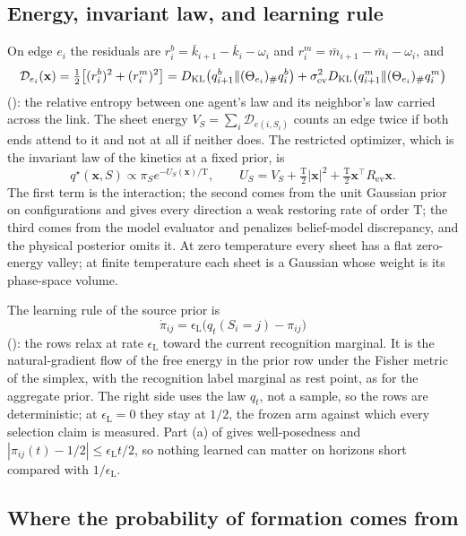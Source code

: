 \subsection{Energy, invariant law, and learning rule}

On edge $e_i$ the residuals are $r^b_i=\bar k_{i+1}-\bar k_i-\omega_i$ and
$r^m_i=\bar m_{i+1}-\bar m_i-\omega_i$, and
\[
\mathcal D_{e_i}(\mathbf x)=\tfrac12\bigl[(r^b_i)^2+(r^m_i)^2\bigr]
=D_{\mathrm{KL}}\bigl(q^b_{i+1}\Vert(\Theta_{e_i})_\#q^b_i\bigr)
+\sigma^2_{\mathrm{ev}}D_{\mathrm{KL}}\bigl(q^m_{i+1}\Vert(\Theta_{e_i})_\#q^m_i\bigr)
\]
(): the relative entropy between one agent's law and its neighbor's law
carried across the link. The sheet energy $V_S=\sum_i\mathcal D_{e(i,S_i)}$ counts an edge twice if both
ends attend to it and not at all if neither does. The restricted optimizer, which is the invariant law of
the kinetics at a fixed prior, is
\[
q^\star(\mathbf x,S)\propto\pi_Se^{-U_S(\mathbf x)/\mathrm T},
\qquad
U_S=V_S+\tfrac{\mathrm T}2|\mathbf x|^2+\tfrac{\mathrm T}2\mathbf x^\top R_{\mathrm{ev}}\mathbf x.
\]
The first term is the interaction; the second comes from the unit Gaussian prior on configurations and
gives every direction a weak restoring rate of order $\mathrm T$; the third comes from the model evaluator
and penalizes belief-model discrepancy, and the physical posterior omits it. At zero temperature every
sheet has a flat zero-energy valley; at finite temperature each sheet is a Gaussian whose weight is its
phase-space volume.

The learning rule of the source prior is
\[
\dot\pi_{ij}=\epsilon_{\mathrm L}\bigl(q_t(S_i=j)-\pi_{ij}\bigr)
\]
(): the rows relax at rate $\epsilon_{\mathrm L}$ toward the current
recognition marginal. It is the natural-gradient flow of the free energy in the prior row under the Fisher
metric of the simplex, with the recognition label marginal as rest point, as for the aggregate prior. The
right side uses the law $q_t$, not a sample, so the rows are deterministic; at $\epsilon_{\mathrm L}=0$
they stay at $1/2$, the frozen arm against which every selection claim is measured. Part (a) of
 gives well-posedness and $|\pi_{ij}(t)-1/2|\le\epsilon_{\mathrm
L}t/2$, so nothing learned can matter on horizons short compared with $1/\epsilon_{\mathrm L}$.

\subsection{Where the probability of formation comes from}

